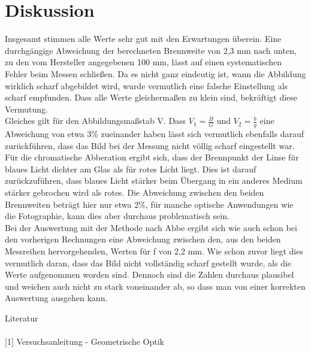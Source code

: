 \section{Diskussion}
Insgesamt stimmen alle Werte sehr gut mit den Erwartungen überein. Eine durchgängige Abweichung der berechneten Brennweite von 2,3 mm nach unten, zu den vom Hersteller angegebenen 100 mm, lässt auf einen systematischen Fehler beim Messen schließen. Da es nicht ganz eindeutig ist, wann die Abbildung wirklich scharf abgebildet wird, wurde vermutlich eine falsche Einstellung als scharf empfunden. Dass alle Werte gleichermaßen zu klein sind, bekräftigt diese Vermutung.\\
Gleiches gilt für den Abbildungsmaßstab V. Dass $V_1 = \frac{B}{G}$ und $V_2 = \frac{b}{g}$ eine Abweichung von etwa 3\% zueinander haben lässt sich vermutlich ebenfalls darauf zurückführen, dass das Bild bei der Messung nicht völlig scharf eingestellt war.\\
Für die chromatische Abberation ergibt sich, dass der Brennpunkt der Linse für blaues Licht dichter am Glas als für rotes Licht liegt. Dies ist darauf zurückzuführen, dass blaues Licht stärker beim Übergang in ein anderes Medium stärker gebrochen wird als rotes. Die Abweichung zwischen den beiden Brennweiten beträgt hier nur etwa 2\%, für manche optische Anwendungen wie die Fotographie, kann dies aber durchaus problematisch sein.\\
Bei der Auswertung mit der Methode nach Abbe ergibt sich wie auch schon bei den vorherigen Rechnungen eine Abweichung zwischen den, aus den beiden Messreihen hervorgehenden, Werten für f von 2,2 mm. Wie schon zuvor liegt dies vermutlich daran, dass das Bild nicht vollständig scharf gestellt wurde, als die Werte aufgenommen worden sind. Dennoch sind die Zahlen durchaus plausibel und weichen auch nicht zu stark voneinander ab, so dass man von einer korrekten Auswertung ausgehen kann.

\parskip 220pt
\Large{Literatur}\\\\
\large{[1] Versuchsanleitung - Geometrische Optik}




